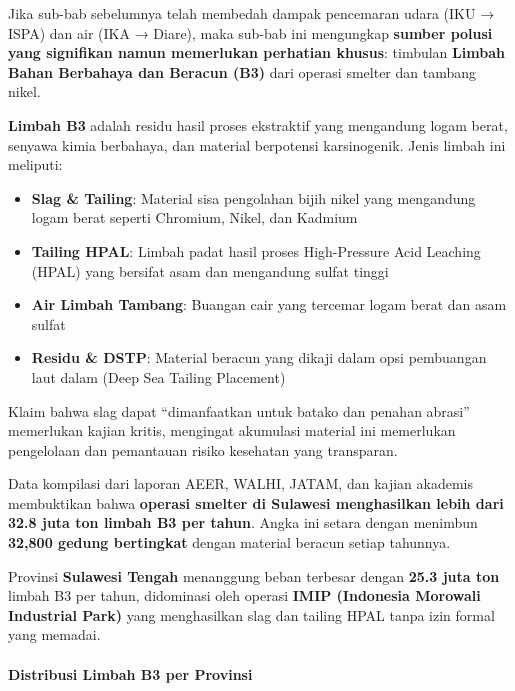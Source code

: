 \documentclass[
]{article}
\providecommand{\tightlist}{%
  \setlength{\itemsep}{0pt}\setlength{\parskip}{0pt}}
\begin{document}
Jika sub-bab sebelumnya telah membedah dampak pencemaran udara (IKU →
ISPA) dan air (IKA → Diare), maka sub-bab ini mengungkap \textbf{sumber
polusi yang signifikan namun memerlukan perhatian khusus}: timbulan
\textbf{Limbah Bahan Berbahaya dan Beracun (B3)} dari operasi smelter
dan tambang nikel.

\textbf{Limbah B3} adalah residu hasil proses ekstraktif yang mengandung
logam berat, senyawa kimia berbahaya, dan material berpotensi
karsinogenik. Jenis limbah ini meliputi:

\begin{itemize}
\tightlist
\item
  \textbf{Slag \& Tailing}: Material sisa pengolahan bijih nikel yang
  mengandung logam berat seperti Chromium, Nikel, dan Kadmium
\item
  \textbf{Tailing HPAL}: Limbah padat hasil proses High-Pressure Acid
  Leaching (HPAL) yang bersifat asam dan mengandung sulfat tinggi
\item
  \textbf{Air Limbah Tambang}: Buangan cair yang tercemar logam berat
  dan asam sulfat
\item
  \textbf{Residu \& DSTP}: Material beracun yang dikaji dalam opsi
  pembuangan laut dalam (Deep Sea Tailing Placement)
\end{itemize}

Klaim bahwa slag dapat ``dimanfaatkan untuk batako dan penahan abrasi''
memerlukan kajian kritis, mengingat akumulasi material ini memerlukan
pengelolaan dan pemantauan risiko kesehatan yang transparan.

Data kompilasi dari laporan AEER, WALHI, JATAM, dan kajian akademis
membuktikan bahwa \textbf{operasi smelter di Sulawesi menghasilkan lebih
dari 32.8 juta ton limbah B3 per tahun}. Angka ini setara dengan
menimbun \textbf{32,800 gedung bertingkat} dengan material beracun
setiap tahunnya.

Provinsi \textbf{Sulawesi Tengah} menanggung beban terbesar dengan
\textbf{25.3 juta ton} limbah B3 per tahun, didominasi oleh operasi
\textbf{IMIP (Indonesia Morowali Industrial Park)} yang menghasilkan
slag dan tailing HPAL tanpa izin formal yang memadai.

\paragraph{Distribusi Limbah B3 per
Provinsi}\label{distribusi-limbah-b3-per-provinsi}
\end{document}
